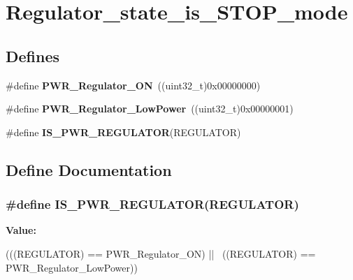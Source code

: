 \hypertarget{group__Regulator__state__is__STOP__mode}{
\section{Regulator\_\-state\_\-is\_\-STOP\_\-mode}
\label{group__Regulator__state__is__STOP__mode}
}
\subsection*{Defines}
\begin{DoxyCompactItemize}
\item 
\hypertarget{group__Regulator__state__is__STOP__mode_gabf58b999bff6b4bf0fb5b97d74a75683}{
\#define {\bfseries PWR\_\-Regulator\_\-ON}~((uint32\_\-t)0x00000000)}
\label{group__Regulator__state__is__STOP__mode_gabf58b999bff6b4bf0fb5b97d74a75683}

\item 
\hypertarget{group__Regulator__state__is__STOP__mode_ga13745136d094661358d373b67ebf1ac7}{
\#define {\bfseries PWR\_\-Regulator\_\-LowPower}~((uint32\_\-t)0x00000001)}
\label{group__Regulator__state__is__STOP__mode_ga13745136d094661358d373b67ebf1ac7}

\item 
\#define {\bfseries IS\_\-PWR\_\-REGULATOR}(REGULATOR)
\end{DoxyCompactItemize}


\subsection{Define Documentation}
\hypertarget{group__Regulator__state__is__STOP__mode_ga03c105070272141c0bab5f2b74469072}{
\subsubsection[{IS\_\-PWR\_\-REGULATOR}]{\setlength{\rightskip}{0pt plus 5cm}\#define IS\_\-PWR\_\-REGULATOR(REGULATOR)}}
\label{group__Regulator__state__is__STOP__mode_ga03c105070272141c0bab5f2b74469072}
{\bfseries Value:}
\begin{DoxyCode}
(((REGULATOR) == PWR_Regulator_ON) || \
                                     ((REGULATOR) == PWR_Regulator_LowPower))
\end{DoxyCode}
